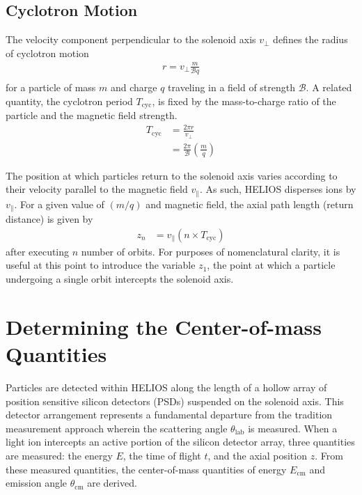 \subsection{Cyclotron Motion}
The velocity component perpendicular to the solenoid axis $v_\perp$ defines the radius of cyclotron motion 
\begin{equation}
\begin{split}
r=v_{\perp}\frac{m}{\mathscr{B}q}\\
\end{split}
\label{cyc_rad}
\end{equation}
for a particle of mass $m$ and charge $q$ traveling in a field of strength $\mathscr{B}$.  A related quantity, the cyclotron period $T_\mathrm{cyc}$, is fixed by the mass-to-charge ratio of the particle and the magnetic field strength. 
\begin{equation}
\begin{split}
T_\mathrm{cyc}&=\frac{2\pi r}{v_{\perp}}\\
       &=\frac{2\pi}{\mathscr{B}} \left(\frac{m}{q}\right)
\end{split}
\label{Tcyc}
\end{equation}
\par The position at which particles return to the solenoid axis varies according to their velocity parallel to the magnetic field $v_\parallel$.  As such, HELIOS disperses ions by $v_\parallel$.  For a given value of $(m/q)$ and magnetic field, the axial path length (return distance) is given by
\begin{equation}
\begin{split}
z_n&=v_\parallel (n \times  T_\mathrm{cyc})
\end{split}
\label{loops}
\end{equation}
after executing $n$ number of orbits.  For purposes of nomenclatural clarity, it is useful at this point to introduce the variable $z_1$, the point at which a particle undergoing a single orbit intercepts the solenoid axis.

\section{Determining the Center-of-mass Quantities}
Particles are detected within HELIOS along the length of a hollow array of position sensitive silicon detectors (PSDs) suspended on the solenoid axis.  This detector arrangement represents a fundamental departure from the tradition measurement approach wherein the scattering angle $\theta_\mathrm{lab}$ is measured.  When a light ion intercepts an active portion of the silicon detector array, three quantities are measured: the energy $E$, the time of flight $t$, and the axial position $z$.    From these measured quantities, the 
center-of-mass quantities of energy $E_\mathrm{cm}$ and emission angle $\theta_\mathrm{cm}$ are derived.  
